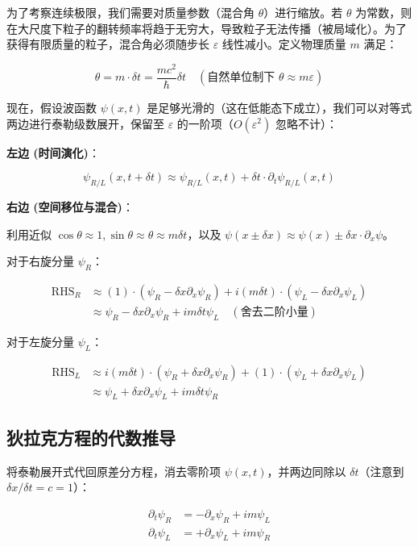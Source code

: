 为了考察连续极限，我们需要对质量参数（混合角 $\theta$）进行缩放。若 $\theta$ 为常数，则在大尺度下粒子的翻转频率将趋于无穷大，导致粒子无法传播（被局域化）。为了获得有限质量的粒子，混合角必须随步长 $\varepsilon$ 线性减小。定义物理质量 $m$ 满足：

\[\theta = m \cdot \delta t = \frac{m c^2}{\hbar} \delta t \quad (\text{自然单位制下 } \theta \approx m \varepsilon)\]

现在，假设波函数 $\psi(x,t)$ 是足够光滑的（这在低能态下成立），我们可以对等式两边进行泰勒级数展开，保留至 $\varepsilon$ 的一阶项（$O(\varepsilon^2)$ 忽略不计）：

\textbf{左边 (时间演化)}：

\[\psi_{R/L}(x, t+\delta t) \approx \psi_{R/L}(x, t) + \delta t \cdot \partial_t \psi_{R/L}(x, t)\]

\textbf{右边 (空间移位与混合)}：

利用近似 $\cos\theta \approx 1, \sin\theta \approx \theta \approx m \delta t$，以及 $\psi(x \pm \delta x) \approx \psi(x) \pm \delta x \cdot \partial_x \psi$。

对于右旋分量 $\psi_R$：

\[\begin{aligned}
\text{RHS}_R &\approx (1) \cdot (\psi_R - \delta x \partial_x \psi_R) + i (m \delta t) \cdot (\psi_L - \delta x \partial_x \psi_L) \\
&\approx \psi_R - \delta x \partial_x \psi_R + i m \delta t \psi_L \quad (\text{舍去二阶小量})
\end{aligned}\]

对于左旋分量 $\psi_L$：

\[\begin{aligned}
\text{RHS}_L &\approx i (m \delta t) \cdot (\psi_R + \delta x \partial_x \psi_R) + (1) \cdot (\psi_L + \delta x \partial_x \psi_L) \\
&\approx \psi_L + \delta x \partial_x \psi_L + i m \delta t \psi_R
\end{aligned}\]

\subsection{狄拉克方程的代数推导}

将泰勒展开式代回原差分方程，消去零阶项 $\psi(x,t)$，并两边同除以 $\delta t$（注意到 $\delta x/\delta t = c = 1$）：

\[\begin{aligned}
\partial_t \psi_R &= -\partial_x \psi_R + i m \psi_L \\
\partial_t \psi_L &= +\partial_x \psi_L + i m \psi_R
\end{aligned}\]


